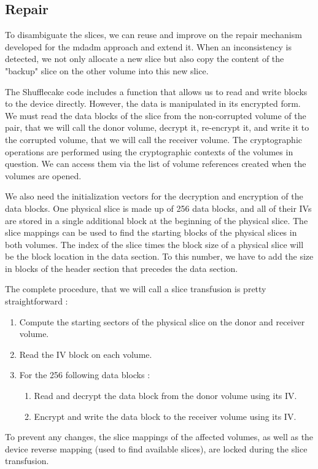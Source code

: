 \documentclass[a4paper,11pt,oneside]{report}
\begin{document}
\subsection{Repair}

To disambiguate the slices, we can reuse and improve on the repair mechanism developed for the mdadm approach and extend it. When an inconsistency is detected, we not only allocate a new slice but also copy the content of the "backup" slice on the other volume into this new slice.

The Shufflecake code includes a function that allows us to read and write blocks to the device directly. However, the data is manipulated in its encrypted form. We must read the data blocks of the slice from the non-corrupted volume of the pair, that we will call the donor volume, decrypt it, re-encrypt it, and write it to the corrupted volume, that we will call the receiver volume. The cryptographic operations are performed using the cryptographic contexts of the volumes in question. We can access them via the list of volume references created when the volumes are opened.

We also need the initialization vectors for the decryption and encryption of the data blocks. One physical slice is made up of 256 data blocks, and all of their IVs are stored in a single additional block at the beginning of the physical slice. The slice mappings can be used to find the starting blocks of the physical slices in both volumes. The index of the slice times the block size of a physical slice will be the block location in the data section. To this number, we have to add the size in blocks of the header section that precedes the data section.

The complete procedure, that we will call a slice transfusion is pretty straightforward :
\begin{enumerate}
    \item Compute the starting sectors of the physical slice on the donor and receiver volume.
    \item Read the IV block on each volume.
    \item For the 256 following data blocks :
    \begin{enumerate}
        \item Read and decrypt the data block from the donor volume using its IV.
        \item Encrypt and write the data block to the receiver volume using its IV.
    \end{enumerate}
\end{enumerate}
To prevent any changes, the slice mappings of the affected volumes, as well as the device reverse mapping (used to find available slices), are locked during the slice transfusion.
\end{document}

